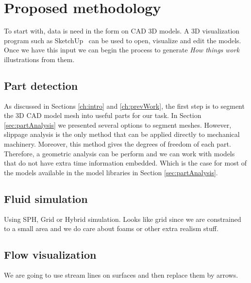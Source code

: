 \chapter{Proposed methodology}

To start with, data is need in the form on CAD 3D models.
A 3D visualization program such as SketchUp~\cite{Trimble2014} can be used to open, visualize and edit the models.
Once we have this input we can begin the process to generate \textit{How things work} illustrations from them.


\section{Part detection}

As discussed in Sections \ref{ch:intro} and \ref{ch:prevWork}, the first step is to segment the 3D CAD model mesh into useful parts for our task.
In Section \ref{sec:partAnalysis} we presented several options to segment meshes.
However, slippage analysis is the only method that can be applied directly to mechanical machinery.
Moreover, this method gives the degrees of freedom of each part. Therefore, a geometric analysis can be perform and we can work with models that do not have extra time information embedded.
Which is the case for most of the models available in the model libraries in Section \ref{sec:partAnalysis}.


\section{Fluid simulation}

Using SPH, Grid or Hybrid simulation.
Looks like grid since we are constrained to a small area and we do care about foams or other extra realism stuff.

\section{Flow visualization}

We are going to use stream lines on surfaces and then replace them by arrows.

